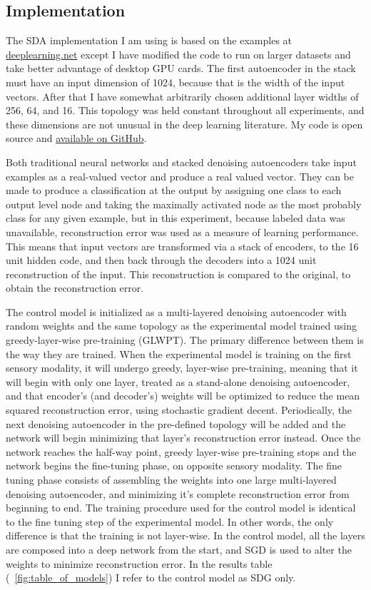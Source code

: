\documentclass[12pt]{article}
\begin{document}
\begin{doublespacing}
	\subsection{Implementation}
	The SDA implementation I am using is based on the examples at \href{http://deeplearning.net/tutorial/}{deeplearning.net} except I have modified the code to run on larger datasets and take better advantage of desktop GPU cards. The first autoencoder in the stack must have an input dimension of 1024, because that is the width of the input vectors. After that I have somewhat arbitrarily chosen additional layer widths of 256, 64, and 16. This topology was held constant throughout all experiments, and these dimensions are not unusual in the deep learning literature. My code is open source and \href{http://github.com/nhnifong/deep-planning}{available on GitHub}. 
	
	Both traditional neural networks and stacked denoising autoencoders take input examples as a real-valued vector and produce a real valued vector. They can be made to produce a classification at the output by assigning one class to each output level node and taking the maximally activated node as the most probably class for any given example, but in this experiment, because labeled data was unavailable, reconstruction error was used as a measure of learning performance. This means that input vectors are transformed via a stack of encoders, to the 16 unit hidden code, and then back through the decoders into a 1024 unit reconstruction of the input. This reconstruction is compared to the original, to obtain the reconstruction error.
	
	The control model is initialized as a multi-layered denoising autoencoder with random weights and the same topology as the experimental model trained using greedy-layer-wise pre-training (GLWPT). The primary difference between them is the way they are trained. When the experimental model is training on the first sensory modality, it will undergo greedy, layer-wise pre-training, meaning that it will begin with only one layer, treated as a stand-alone denoising autoencoder, and that encoder's (and decoder's) weights will be optimized to reduce the mean squared reconstruction error, using stochastic gradient decent. Periodically, the next denoising autoencoder in the pre-defined topology will be added and the network will begin minimizing that layer's reconstruction error instead. Once the network reaches the half-way point, greedy layer-wise pre-training stops and the network begins the fine-tuning phase, on opposite sensory modality. The fine tuning phase consists of assembling the weights into one large multi-layered denoising autoencoder, and minimizing it's complete reconstruction error from beginning to end. The training procedure used for the control model is identical to the fine tuning step of the experimental model. In other words, the only difference is that the training is not layer-wise. In the control model, all the layers are composed into a deep network from the start, and SGD is used to alter the weights to minimize reconstruction error. In the results table (~\ref{fig:table_of_models}) I refer to the control model as SDG only.
	

\end{doublespacing}
\end{document}
